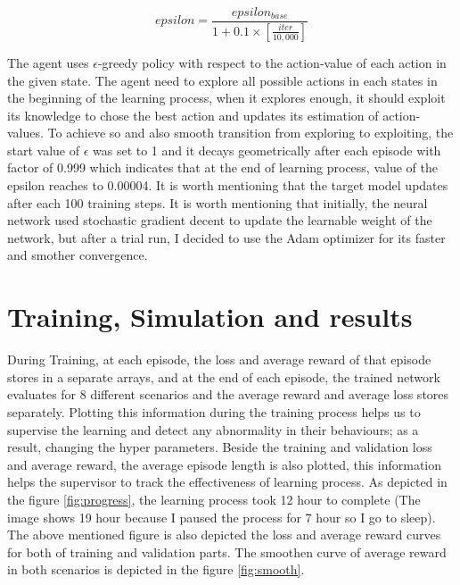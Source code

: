 \documentclass[lettersize,journal]{IEEEtran}
\begin{document}
    \begin{equation}
    epsilon = \frac{epsilon_{base}}{1 + 0.1 \times [\frac{iter}{10,000}]}
    \end{equation}
    
    The agent uses $\epsilon$-greedy policy with respect to the action-value of each action in the given state. The agent need to explore all possible actions in each states in the beginning of the learning process, when it explores enough, it should exploit its knowledge to chose the best action and updates its estimation of action-values. To achieve so and also smooth transition from exploring to exploiting, the start value of $\epsilon$ was set to 1 and it decays geometrically after each episode with factor of 0.999 which indicates that at the end of learning process, value of the epsilon reaches to 0.00004. It is worth mentioning that the target model updates after each 100 training steps. It is worth mentioning that initially, the neural network used stochastic gradient decent to update the learnable weight of the network, but after a trial run, I decided to use the Adam optimizer for its faster and smother convergence.
    

\section{Training, Simulation and results}
During Training, at each episode, the loss and average reward of that episode stores in a separate arrays, and at the end of each episode, the trained network evaluates for 8 different scenarios and the average reward and average loss stores separately. Plotting this information during the training process helps us to supervise the learning and detect any abnormality in their behaviours; as a result, changing the hyper parameters. Beside the training and validation loss and average reward, the average episode length is also plotted, this information helps the supervisor to track the effectiveness of learning process. As depicted in the figure \ref{fig:progress}, the learning process took 12 hour to complete (The image shows 19 hour because I paused the process for 7 hour so I go to sleep). The above mentioned figure is also depicted the loss and average reward curves for both of training and validation parts. The smoothen curve of average reward in both scenarios is depicted in the figure \ref{fig:smooth}. \par
\end{document}
